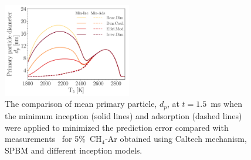 
\begin{figure}[H]
	\centering
	\includegraphics[width=0.5\textwidth]{Figures/Results/Shocktube/Agafonov2016_cpr/d_p_maxincads_combined.pdf}
	\caption{The comparison of mean primary particle, $d_p$, at $t=1.5$~ms when the minimum inception (solid lines) and adsorption (dashed lines) were applied to minimized the prediction error compared with measurements~\citep{agafonov2016unified} for 5\%~$\mathrm{CH_4}$-Ar obtained using Caltech mechanism, SPBM and different inception models.}
	\label{fig:shockagof_dp_maxincads_cpr} 
\end{figure}


